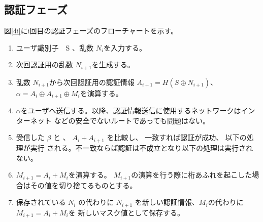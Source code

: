 \documentclass{thesis}
\begin{document}
\subsection{認証フェーズ}
図\ref{4i}にi回目の認証フェーズのフローチャートを示す。

\begin{enumerate}[1.]
				\item ユーザ識別子　S 、乱数 $N_{i}$を入力する。
				\item 次回認証用の乱数 $N_{i+1}$を生成する。
				\item 乱数 $N_{i+1}$から次回認証用の認証情報 $A_{i+1} = H(S \oplus N_{i+1} )$、
				$\alpha = A_i \oplus A_{i+1} \oplus M_i$を演算する。
				\item $\alpha$をユーザへ送信する。以降、認証情報送信に使用するネットワークはインターネット
				などの安全でないルートであっても問題はない。
				\item 受信した $\beta$  と 、 $A_i + A_{i+1}$ を比較し、 一致すれば認証が成功、 以下の処理が実行
				される。不一致ならば認証は不成立となり以下の処理は実行されない。
				\item $M_{i+1}=A_i + M_i$を演算する。
				$M_{i+1}$の演算を行う際に桁あふれを起こした場合はその値を切り捨てるものとする。
				\item 保存されている $N_i$ の代わりに $N_{i+1}$ を新しい認証情報、$M_i$の代わりに$M_{i+1}=A_{i}+M_{i}$を
				新しいマスク値として保存する。	
\end{enumerate}
\end{document}
